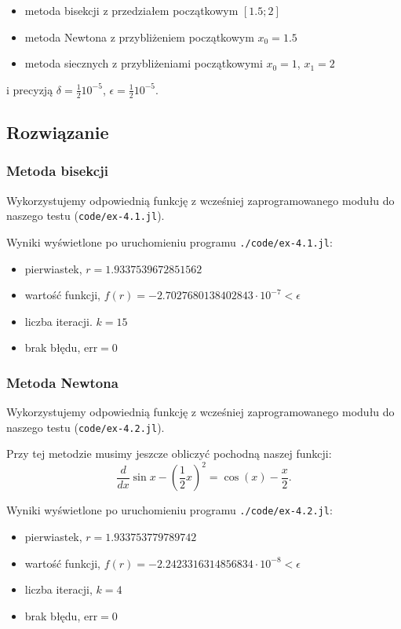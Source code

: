\documentclass[10pt]{article}
\begin{document}
\begin{itemize}
    \item metoda bisekcji z przedziałem początkowym $[1.5;2]$
    \item metoda Newtona z przybliżeniem początkowym $x_0 = 1.5$
    \item metoda siecznych z przybliżeniami początkowymi $x_0 = 1$, $x_1 = 2$
\end{itemize}

\noindent i precyzją $\delta = \frac{1}{2} 10^{-5}$, $\epsilon = \frac{1}{2} 10^{-5}$.

\subsection{Rozwiązanie}

\subsubsection{Metoda bisekcji}

Wykorzystujemy odpowiednią funkcję z wcześniej zaprogramowanego modułu do naszego testu (\texttt{code/ex-4.1.jl}).

\noindent Wyniki wyświetlone po uruchomieniu programu \texttt{./code/ex-4.1.jl}:
\begin{itemize}
    \item pierwiastek, $r = 1.9337539672851562$
    \item wartość funkcji, $f(r) = -2.7027680138402843 \cdot 10^{-7} < \epsilon$
    \item liczba iteracji. $k = 15$
    \item brak błędu, $\mathrm{err} = 0$
\end{itemize}

\subsubsection{Metoda Newtona}

Wykorzystujemy odpowiednią funkcję z wcześniej zaprogramowanego modułu do naszego testu (\texttt{code/ex-4.2.jl}).

Przy tej metodzie musimy jeszcze obliczyć pochodną naszej funkcji:
$$
\frac{d}{dx} \sin x - \left(\frac{1}{2} x\right)^2 = \cos(x) - \frac{x}{2}.
$$

\noindent Wyniki wyświetlone po uruchomieniu programu \texttt{./code/ex-4.2.jl}:
\begin{itemize}
    \item pierwiastek, $r = 1.933753779789742$
    \item wartość funkcji, $f(r) = -2.2423316314856834 \cdot 10^{-8} < \epsilon$
    \item liczba iteracji, $k = 4$
    \item brak błędu, $\mathrm{err} = 0$
\end{itemize}
\end{document}
